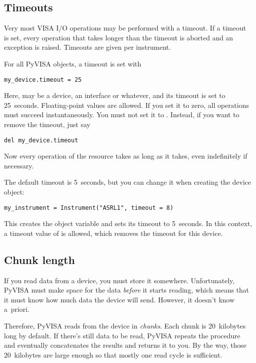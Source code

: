 \documentclass{howto}
\begin{document}
\subsection{Timeouts}
\label{sec:timeouts}

Very most VISA I/O operations may be performed with a timeout.  If a timeout is
set, every operation that takes longer than the timeout is aborted and an
exception is raised.  Timeouts are given per instrument.

For all PyVISA objects, a timeout is set with
\begin{verbatim}
my_device.timeout = 25
\end{verbatim}
Here,  may be a device, an interface or whatever, and its
timeout is set to 25~seconds.  Floating-point values are allowed.  If you set
it to zero, all operations must succeed instantaneously.  You must not set it
to .  Instead, if you want to remove the timeout, just say
\begin{verbatim}
del my_device.timeout
\end{verbatim}
Now every operation of the resource takes as long as it takes, even
indefinitely if necessary.

The default timeout is 5~seconds, but you can change it when creating the
device object:
\begin{verbatim}
my_instrument = Instrument("ASRL1", timeout = 8)
\end{verbatim}
This creates the object variable  and sets its timeout to
5~seconds.  In this context, a timeout value of  is allowed, which
removes the timeout for this device.


\subsection{Chunk length}
\label{sec:chunk-length}

If you read data from a device, you must store it somewhere.  Unfortunately,
PyVISA must make space for the data \emph{before} it starts reading, which
means that it must know how much data the device will send.  However, it
doesn't know a~priori.

Therefore, PyVISA reads from the device in \emph{chunks}.  Each chunk is
20~kilobytes long by default.  If there's still data to be read, PyVISA repeats
the procedure and eventually concatenates the results and returns it to you.
By the way, those 20~kilobytes are large enough so that mostly one read cycle
is sufficient.
\end{document}
